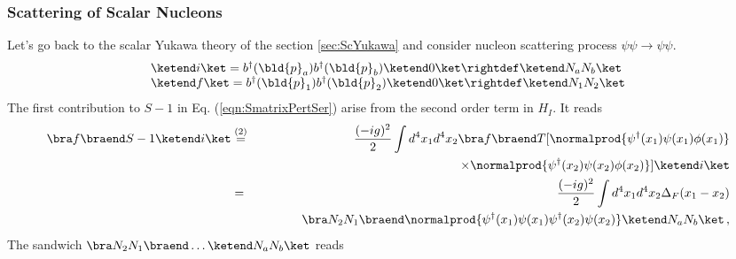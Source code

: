 \subsubsection{Scattering of Scalar Nucleons}
Let's go back to the scalar Yukawa theory of the section \ref{sec:ScYukawa} and 
consider nucleon scattering process $\psi \psi \to \psi \psi$.
\begin{eqnarray}
\begin{array}{l}
\ketend i \ket
=
b^\dagger(\bld{p}_a) b^\dagger(\bld{p}_b) \ketend 0 \ket
\rightdef
\ketend N_a N_b \ket
\\
\ketend f \ket
=
b^\dagger(\bld{p}_1) b^\dagger(\bld{p}_2) \ketend 0 \ket
\rightdef
\ketend N_1 N_2 \ket
\end{array}
\end{eqnarray}
The first contribution to $S - 1$ in Eq. (\ref{eqn:SmatrixPertSer}) arise from 
the second order term in $H_I$. It reads
\begin{eqnarray}
\bra f \braend S - 1 \ketend i \ket
&\stackrel{(2)}{=}&
\frac{(-i g)^2}{2} \int d^4 x_1 d^4 x_2
\bra f \braend
T[
\normalprod{\psi^\dagger(x_1) \psi(x_1) \phi(x_1)}
\nonumber\\
&&
\hspace{35mm}
\times
\normalprod{\psi^\dagger(x_2) \psi(x_2) \phi(x_2)}
]
\ketend i \ket
\nonumber\\
&=&
\frac{(-i g)^2}{2} \int d^4 x_1 d^4 x_2
\Delta_F(x_1 - x_2)
\nonumber\\
&&
\hspace{12mm}
\bra N_2 N_1 \braend
\normalprod{
\psi^\dagger(x_1) \psi(x_1) 
\psi^\dagger(x_2) \psi(x_2)
}
\ketend N_a N_b \ket\,,
\nonumber\\
\label{eqn:scYS2ndord}
\end{eqnarray}
The sandwich $\bra N_2 N_1 \braend \dots \ketend N_a N_b \ket$ reads
